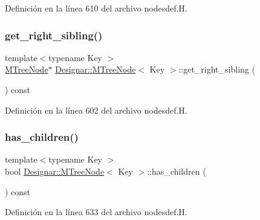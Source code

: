Definición en la línea 610 del archivo nodesdef.\+H.

\mbox{\label{class_designar_1_1_m_tree_node_a1da0c771ce14330be0e13716c242a0a3}} 
\subsubsection{\texorpdfstring{get\+\_\+right\+\_\+sibling()}{get\_right\_sibling()}}
{\footnotesize\ttfamily template$<$typename Key $>$ \\
\hyperlink{class_designar_1_1_m_tree_node}{M\+Tree\+Node}$\ast$ \hyperlink{class_designar_1_1_m_tree_node}{Designar\+::\+M\+Tree\+Node}$<$ Key $>$\+::get\+\_\+right\+\_\+sibling (\begin{DoxyParamCaption}{ }\end{DoxyParamCaption}) const\hspace{0.3cm}{\ttfamily [inline]}}



Definición en la línea 602 del archivo nodesdef.\+H.

\mbox{\label{class_designar_1_1_m_tree_node_ae3f1add8565b20f3957e512c9d64cea1}} 
\subsubsection{\texorpdfstring{has\+\_\+children()}{has\_children()}}
{\footnotesize\ttfamily template$<$typename Key $>$ \\
bool \hyperlink{class_designar_1_1_m_tree_node}{Designar\+::\+M\+Tree\+Node}$<$ Key $>$\+::has\+\_\+children (\begin{DoxyParamCaption}{ }\end{DoxyParamCaption}) const\hspace{0.3cm}{\ttfamily [inline]}}



Definición en la línea 633 del archivo nodesdef.\+H.

